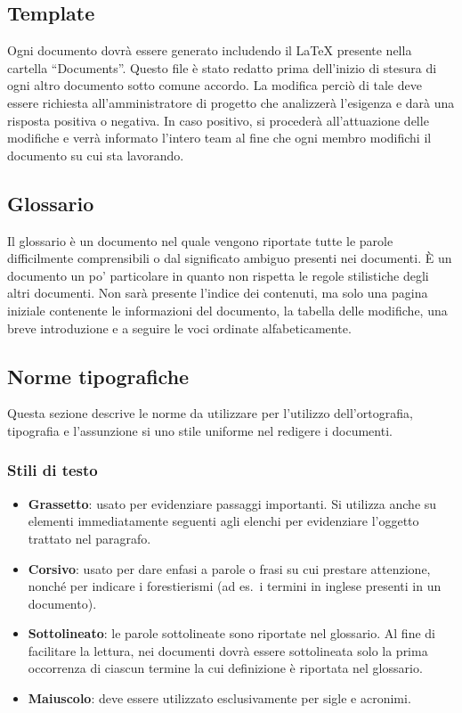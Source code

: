 \subsection{Template}
Ogni documento dovrà essere generato includendo il  \LaTeX{} presente nella cartella ``Documents''. Questo file è stato redatto prima dell'inizio di stesura di ogni altro documento sotto comune accordo. La modifica perciò di tale  deve essere richiesta all'amministratore di progetto che analizzerà l'esigenza e darà una risposta positiva o negativa. In caso positivo, si procederà all'attuazione delle modifiche e verrà informato l'intero team al fine che ogni membro modifichi il documento su cui sta lavorando.

\subsection{Glossario}
Il glossario è un documento nel quale vengono riportate tutte le parole difficilmente comprensibili o dal significato ambiguo presenti nei documenti. È un documento un po' particolare in quanto non rispetta le regole stilistiche degli altri documenti. Non sarà presente l'indice dei contenuti, ma solo una pagina iniziale contenente le informazioni del documento, la tabella delle modifiche, una breve introduzione e a seguire le voci ordinate alfabeticamente.

\subsection{Norme tipografiche}
Questa sezione descrive le norme da utilizzare per l'utilizzo dell'ortografia, tipografia e l'assunzione si uno stile uniforme nel redigere i documenti.

\subsubsection{Stili di testo}
\begin{itemize}
\item \textbf{Grassetto}: usato per evidenziare passaggi importanti. Si utilizza anche su elementi immediatamente seguenti agli elenchi per evidenziare l'oggetto trattato nel paragrafo.
\item \textbf{Corsivo}: usato per dare enfasi a parole o frasi su cui prestare attenzione, nonché per indicare i forestierismi (ad es.~i termini in inglese presenti in un documento).
\item \textbf{Sottolineato}: le parole sottolineate sono riportate nel glossario. Al fine di facilitare la lettura, nei documenti dovrà essere sottolineata solo la prima occorrenza di ciascun termine la cui definizione è riportata nel glossario.
\item \textbf{Maiuscolo}: deve essere utilizzato esclusivamente per sigle e acronimi.
\end{itemize}

